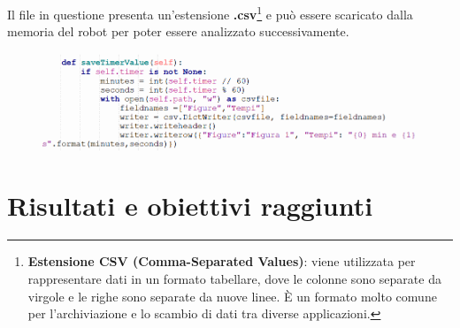 \begin{sloppypar}
{\begin{itemize}
Il file in questione presenta un'estensione \textbf{.csv}\footnote{\textbf{Estensione CSV (Comma-Separated Values)}: viene utilizzata per rappresentare dati in un formato tabellare, dove le colonne sono separate da virgole e le righe sono separate da nuove linee. È un formato molto comune per l'archiviazione e lo scambio di dati tra diverse applicazioni.} e può essere scaricato dalla memoria del robot per poter essere analizzato successivamente.
\vspace{0.6cm}
\begin{figure}[H]
\centering
\includegraphics[width=1.15\textwidth]{immagini/stv.png}
\end{figure}
\vspace{0.4cm}
\end{itemize}
}
\newpage
\section{Risultati e obiettivi raggiunti}
\fontsize{12}{19}\selectfont{Questa sezione offre l'opportunità di riepilogare ed analizzare i principali risultati ottenuti e di sottolineare l'allineamento tra gli obiettivi prefissati e quelli raggiunti.\newline

}
\end{sloppypar}
